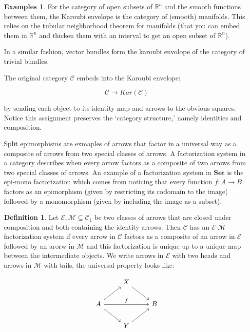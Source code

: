 \documentclass[11pt]{amsart}
\theoremstyle{plain}
\theoremstyle{definition}
\newtheorem{defn}[thm]{Definition}
\newtheorem*{egs*}{Examples}
\newcommand{\mR}{{\mathbb R}}
\newcommand{\cC}{{\mathcal C}}
\newcommand{\cE}{{\mathcal E}}
\newcommand{\cM}{{\mathcal M}}
\newcommand{\Set}{{\mathbf{Set}}}
\newcommand{\noi}{{\noindent}}
\begin{document}
\begin{egs*}
For the category of open subsets of $\mR^n$ and the smooth functions between them, the Karoubi envelope is the category of (smooth) manifolds. This relies on the tubular neighborhood theorem for manifolds (that you can embed them in $\mR^n$ and thicken them with an interval to get an open subset of $\mR^n$). \par

\noi In a similar fashion, vector bundles form the karoubi envolope of the category of trivial bundles. \par
\end{egs*}

The original category $\cC$ embeds into the Karoubi envelope: 

\[ \cC \to Kar(\cC) \]

\noi by sending each object to its identity map and arrows to the obvious squares. Notice this assignment preserves the `category structure{,}' namely identities and composition.\par 

Split epimorphisms are exmaples of arrows that factor in a universal way as a composite of arrows from two special classes of arrows. A factorization system in a category describes when every arrow factors as a composite of two arrows from two special classes of arrows. An example of a factorization system in $\Set$ is the epi-mono factorization which comes from noticing that every function $f: A \to B$ factors as an epimorphism (given by restricting its codomain to the image) followed by a monomorphism (given by including the image as a subset). 

\begin{defn}
Let $\cE, \cM \subseteq \cC_1$ be two classes of arrows that are closed under composition and both containing the identity arrows. Then $\cC$ has an $\cE$-$\cM$ factorization system if every arrow in $\cC$ factors as a composite of an arrow in $\cE$ followed by an arorw in $\cM$ and this factorization is unique up to a unique map between the intermediate objects. We write arrows in $\cE$ with two heads and arrows in $\cM$ with tails, the universal property looks like: 

\[\begin{tikzcd}
  & X \ar[dr] & \\
  A \ar[ur] \ar[dr] \rar[rr, "f"] && B \\
  & Y \ar[ur] & 
\end{tikzcd}\]
\end{defn}
\end{document}
